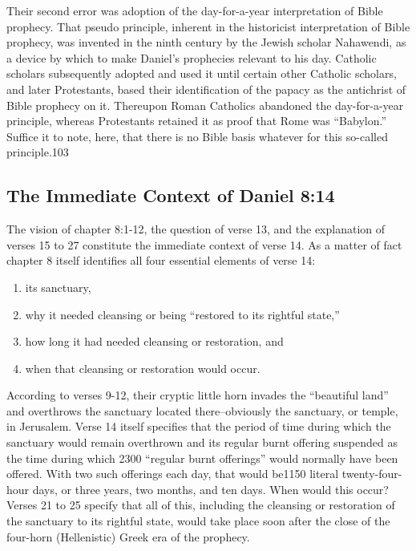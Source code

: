 Their second error was adoption of the day-for-a-year interpretation of
Bible prophecy. That pseudo principle, inherent in the historicist
interpretation of Bible prophecy, was invented in the ninth century by the
Jewish scholar Nahawendi, as a device by which to make Daniel's prophecies
relevant to his day. Catholic scholars subsequently adopted and used it
until certain other Catholic scholars, and later Protestants, based
their identification of the papacy as the antichrist of Bible prophecy on
it. Thereupon Roman Catholics abandoned the day-for-a-year principle,
whereas Protestants retained it as proof that Rome was ``Babylon.'' Suffice it
to note, here, that there is no Bible basis whatever for this so-called
principle.103

\subsection{The Immediate Context of Daniel 8:14}

The vision of chapter 8:1-12, the question of verse 13, and the explanation
of verses 15 to 27 constitute the immediate context of verse 14. As a matter
of fact chapter 8 itself identifies all four essential elements of verse 14:
\begin{enumerate}
	\item its sanctuary, 
	\item why it needed cleansing or being ``restored to its
rightful state,'' 
	\item how long it had needed cleansing or restoration, and
	\item when that cleansing or restoration would occur.
\end{enumerate}

According to verses 9-12, their cryptic little horn invades the ``beautiful
land'' and overthrows the sanctuary located there--obviously the sanctuary,
or temple, in Jerusalem. Verse 14 itself specifies that the period of time
during which the sanctuary would remain overthrown and its regular burnt
offering suspended as the time during which 2300 ``regular burnt offerings''
would normally have been offered. With two such offerings each day, that
would be1150 literal twenty-four-hour days, or three years, two months, and
ten days. When would this occur? Verses 21 to 25 specify that all of this,
including the cleansing or restoration of the sanctuary to its rightful
state, would take place soon after the close of the four-horn (Hellenistic)
Greek era of the prophecy.

